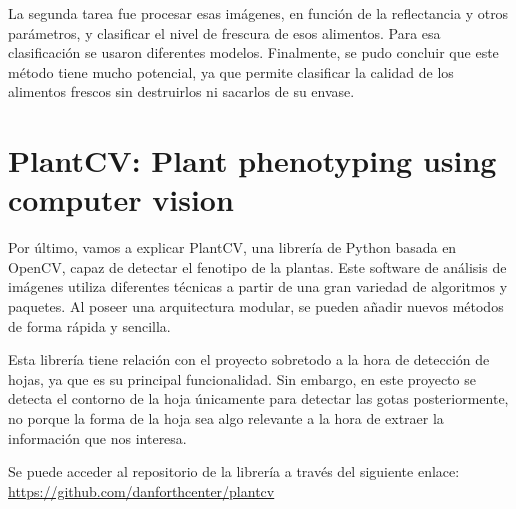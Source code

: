 
La segunda tarea fue procesar esas imágenes, en función de la reflectancia y otros parámetros, y clasificar el nivel de frescura de esos alimentos. Para esa clasificación se usaron diferentes modelos. Finalmente, se pudo concluir que este método tiene mucho potencial, ya que permite clasificar la calidad de los alimentos frescos sin destruirlos ni sacarlos de su envase.


\section{PlantCV: Plant phenotyping using computer vision}
Por último, vamos a explicar PlantCV, una librería de Python basada en OpenCV, capaz de detectar el fenotipo de la plantas. Este software de análisis de imágenes utiliza diferentes técnicas a partir de una gran variedad de algoritmos y paquetes. Al poseer una arquitectura modular, se pueden añadir nuevos métodos de forma rápida y sencilla.

Esta librería tiene relación con el proyecto sobretodo a la hora de detección de hojas, ya que es su principal funcionalidad. Sin embargo, en este proyecto se detecta el contorno de la hoja únicamente para detectar las gotas posteriormente, no porque la forma de la hoja sea algo relevante a la hora de extraer la información que nos interesa.

Se puede acceder al repositorio de la librería a través del siguiente enlace:
\href{https://github.com/danforthcenter/plantcv}{https://github.com/danforthcenter/plantcv}





